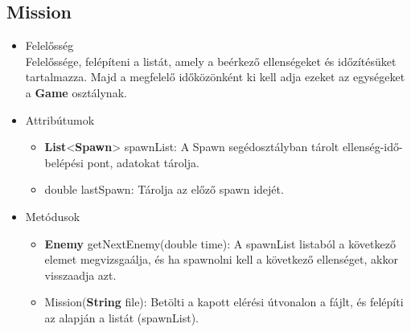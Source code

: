 \subsection{Mission}
\begin{itemize}
\item Felelősség\\
Felelőssége, felépíteni a listát, amely a beérkező ellenségeket és időzítésüket tartalmazza. Majd a megfelelő időközönként ki kell adja ezeket az egységeket a \textbf{Game} osztálynak.
\item Attribútumok
	\begin{itemize}
		\item \textbf{List}<\textbf{Spawn}> spawnList: A Spawn segédosztályban tárolt ellenség-idő-belépési pont, adatokat tárolja.
		\item double lastSpawn: Tárolja az előző spawn idejét.
	\end{itemize}
\item Metódusok
	\begin{itemize}
		\item \textbf{Enemy} getNextEnemy(double time): A spawnList listaból a következő elemet megvizsgaálja, és ha spawnolni kell a következő ellenséget, akkor visszaadja azt.
		\item Mission(\textbf{String} file): Betölti a kapott elérési útvonalon a fájlt, és felépíti az alapján a listát (spawnList).
	\end{itemize}
\end{itemize}


